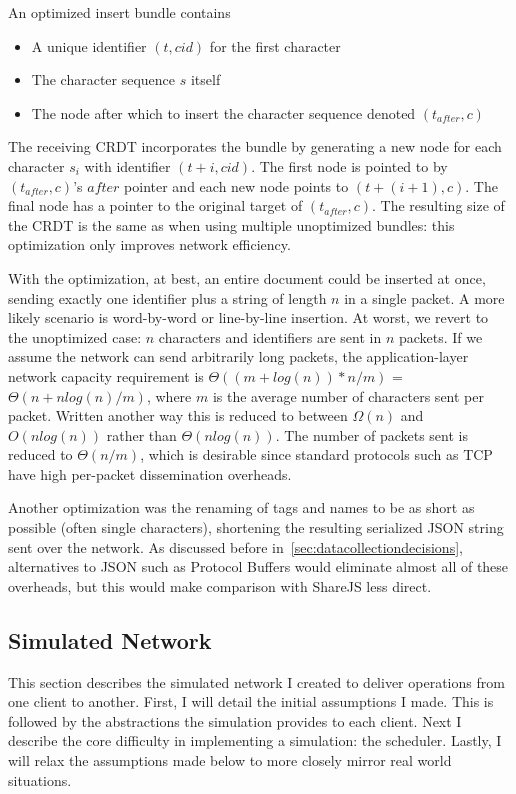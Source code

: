 \documentclass[12pt,a4paper,twoside,openright]{report}
\begin{document}
			An optimized insert bundle contains
			\begin{itemize}
				\item A unique identifier  $(t, cid)$ for the first character
				\item The character sequence $s$ itself
				\item The node after which to insert the character sequence denoted $(t_{after}, c)$
			\end{itemize}
			
			The receiving CRDT incorporates the bundle by generating a new node for each character $s_i$ with identifier $(t + i, cid)$. The first node is pointed to by $(t_{after}, c)$'s $after$ pointer and each new node points to $(t + (i+1), c)$. The final node has a pointer to the original target of $(t_{after}, c)$. The resulting size of the CRDT is the same as when using multiple unoptimized bundles: this optimization only improves network efficiency.
			
			With the optimization, at best, an entire document could be inserted at once, sending exactly one identifier plus a string of length $n$ in a single packet. A more likely scenario is word-by-word or line-by-line insertion. At worst, we revert to the unoptimized case: $n$ characters and identifiers are sent in $n$ packets. If we assume the network  can send arbitrarily long packets, the application-layer network capacity requirement is $\Theta ((m+log(n)) * n/m)$ = $\Theta (n + nlog(n)/m)$, where $m$ is the average number of characters sent per packet. Written another way this is reduced to between $\Omega (n)$ and $O(nlog(n))$ rather than $\Theta(nlog(n))$. The number of packets sent is reduced to $\Theta(n/m)$, which is desirable since standard protocols such as TCP have high per-packet dissemination overheads.
			
			Another optimization was the renaming of tags and names to be as short as possible (often single characters), shortening the resulting serialized JSON string sent over the network. As discussed before in~\cref{sec:datacollectiondecisions}, alternatives to JSON such as Protocol Buffers would eliminate almost all of these overheads, but this would make comparison with ShareJS less direct.
	
	\subsection{Simulated Network}
	
		This section describes the simulated network I created to deliver operations from one client to another. First, I will detail the initial assumptions I made. This is followed by the abstractions the simulation provides to each client. Next I describe the core difficulty in implementing a simulation: the scheduler. Lastly, I will relax the assumptions made below to more closely mirror real world situations.
		
\end{document}
